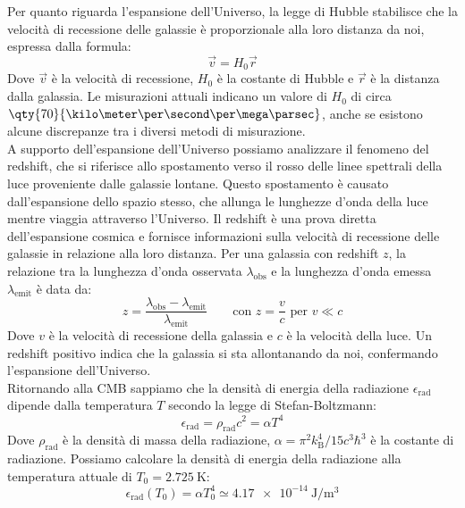 Per quanto riguarda l'espansione dell'Universo, la legge di Hubble stabilisce che la velocità di recessione delle galassie è proporzionale alla loro distanza da noi, espressa dalla formula:
\begin{equation}
    \vec{v} = H_0 \vec{r}
\end{equation}
Dove $\vec{v}$ è la velocità di recessione, $H_0$ è la costante di Hubble e $\vec{r}$ è la distanza dalla galassia. Le misurazioni attuali indicano un valore di $H_0$ di circa $\qty{70}{\kilo\meter\per\second\per\mega\parsec}$, anche se esistono alcune discrepanze tra i diversi metodi di misurazione.\\
A supporto dell'espansione dell'Universo possiamo analizzare il fenomeno del redshift, che si riferisce allo spostamento verso il rosso delle linee spettrali della luce proveniente dalle galassie lontane. Questo spostamento è causato dall'espansione dello spazio stesso, che allunga le lunghezze d'onda della luce mentre viaggia attraverso l'Universo. Il redshift è una prova diretta dell'espansione cosmica e fornisce informazioni sulla velocità di recessione delle galassie in relazione alla loro distanza. Per una galassia con redshift $z$, la relazione tra la lunghezza d'onda osservata $\lambda_{\text{obs}}$ e la lunghezza d'onda emessa $\lambda_{\text{emit}}$ è data da:
\begin{equation}
    z = \dfrac{\lambda_{\text{obs}} - \lambda_{\text{emit}}}{\lambda_{\text{emit}}} \qquad \text{con } z = \dfrac{v}{c} \text{ per } v \ll c
\end{equation}
Dove $v$ è la velocità di recessione della galassia e $c$ è la velocità della luce. Un redshift positivo indica che la galassia si sta allontanando da noi, confermando l'espansione dell'Universo.\\
Ritornando alla CMB sappiamo che la densità di energia della radiazione $\epsilon_{\text{rad}}$ dipende dalla temperatura $T$ secondo la legge di Stefan-Boltzmann:
\begin{equation}
    \epsilon_{\text{rad}} = \rho_{\text{rad}}c^2 = \alpha T^4
\end{equation}
Dove $\rho_{\text{rad}}$ è la densità di massa della radiazione, $\alpha = \pi^2 k_{\text{B}}^4 / 15 c^3 \hbar^3$ è la costante di radiazione. Possiamo calcolare la densità di energia della radiazione alla temperatura attuale di $T_0 = \qty{2.725}{\kelvin}$:
\begin{equation}
    \epsilon_{\text{rad}}(T_0) = \alpha T_0^4 \simeq \qty{4.17e-14}{\joule\per\meter\cubed}
\end{equation}
